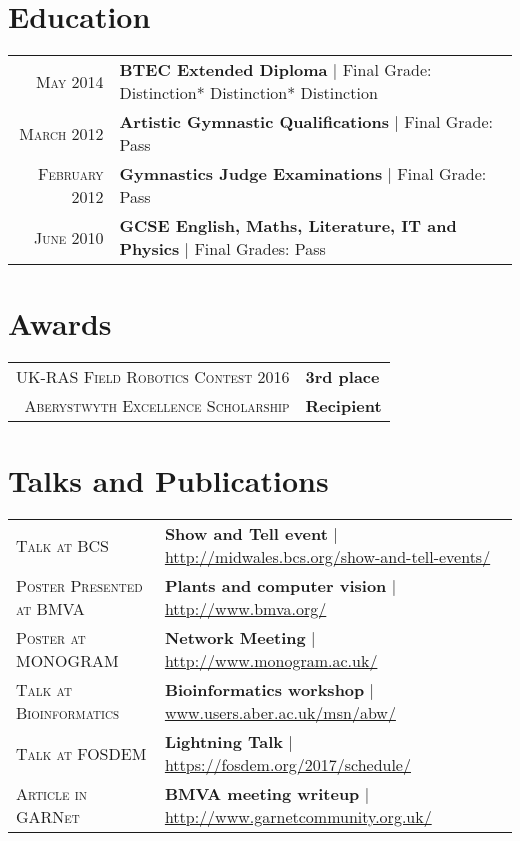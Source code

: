 \documentclass[a4paper,10pt]{article}
\begin{document}
\section{Education}
\begin{tabular}{rl}	
  \textsc{May} 2014& \textbf{BTEC Extended Diploma} | Final Grade: Distinction* Distinction* Distinction
  \\
  \textsc{March} 2012& \textbf{Artistic Gymnastic Qualifications} | Final Grade: Pass
  \\
  \textsc{February} 2012& \textbf{Gymnastics Judge Examinations} | Final Grade: Pass
  \\
  \textsc{June} 2010& \textbf{GCSE English, Maths, Literature, IT and Physics} | Final Grades: Pass
\end{tabular}


\section{Awards}
\begin{tabular}{rl}	
  \textsc{UK-RAS Field Robotics Contest 2016}& \textbf{3rd place}
  \\
  \textsc{Aberystwyth Excellence Scholarship}& \textbf{Recipient}
\end{tabular}


\section{Talks and Publications}
\begin{tabular}{ll}	
  \textsc{Talk at BCS} & \textbf{Show and Tell event} | \href{http://www.midwales.bcs.org/show-and-tell-events/}{http://midwales.bcs.org/show-and-tell-events/}\\
  \textsc{Poster Presented at BMVA} & \textbf{Plants and computer vision} | \href{http://www.bmva.org/}{http://www.bmva.org/}\\
  \textsc{Poster at MONOGRAM} & \textbf{Network Meeting} | \href{http://www.monogram.ac.uk/}{http://www.monogram.ac.uk/}\\ 
  \textsc{Talk at Bioinformatics} & \textbf{Bioinformatics workshop} | \href{www.users.aber.ac.uk/msn/abw/index.html}{www.users.aber.ac.uk/msn/abw/} \\
  \textsc{Talk at FOSDEM} & \textbf{Lightning Talk} | \href{https://fosdem.org/2017/schedule/}{https://fosdem.org/2017/schedule/}\\
  \textsc{Article in GARNet} & \textbf{BMVA meeting writeup} | \href{http://www.garnetcommunity.org.uk}{http://www.garnetcommunity.org.uk/}                         
\end{tabular}
\end{document}
